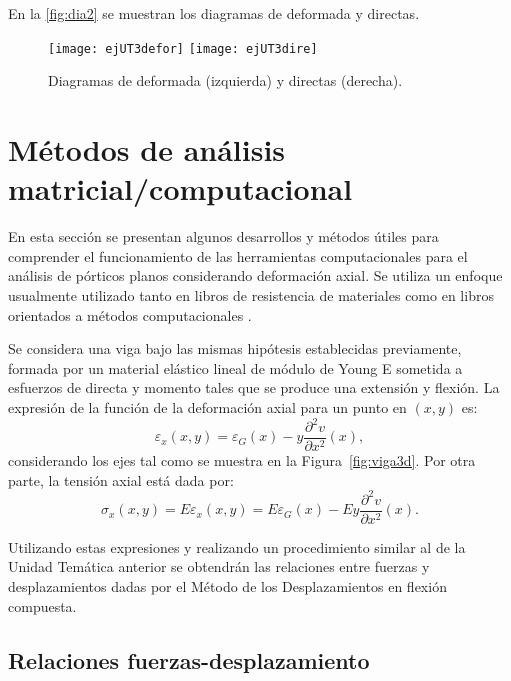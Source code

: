 En la \autoref{fig:dia2} se muestran los diagramas de deformada y directas.
\begin{figure}[htb]
	\centering
	\texttt{[image: ejUT3defor]}
	\texttt{[image: ejUT3dire]}
	\caption{Diagramas de deformada (izquierda) y directas (derecha).}
	\label{fig:dia2}
\end{figure}


\clearpage







\section{Métodos de análisis matricial/computacional}

En esta sección se presentan algunos desarrollos y métodos útiles para comprender el funcionamiento de las herramientas computacionales para el análisis de pórticos planos considerando deformación axial. %
%
Se utiliza un enfoque usualmente utilizado tanto en libros de resistencia de materiales \citep{Pilkey2002} como en libros orientados a métodos computacionales \citep{Onate2013}. %

Se considera una viga bajo las mismas hipótesis establecidas previamente, formada por un material elástico lineal de módulo de Young E sometida a esfuerzos de directa y momento tales que se produce una extensión y flexión. %
%
La expresión de la función de la deformación axial para un punto en $(x,y)$ es:
%
\begin{equation}
\varepsilon_x (x,y) = \varepsilon_G(x) - y \frac{\partial^2 v}{\partial x^2} (x),
\end{equation}
considerando los ejes tal como se muestra en la Figura~\ref{fig:viga3d}. %
Por otra parte, la tensión axial está dada por:
%
\begin{equation}
\sigma_x (x,y) = E \varepsilon_x(x,y) = E \varepsilon_G(x) - E y \frac{\partial^2 v}{\partial x^2} (x).
\end{equation}

Utilizando estas expresiones y realizando un procedimiento similar al de la Unidad Temática anterior se obtendrán las relaciones entre fuerzas y desplazamientos dadas por el Método de los Desplazamientos en flexión compuesta.

\subsection{Relaciones fuerzas-desplazamiento}

